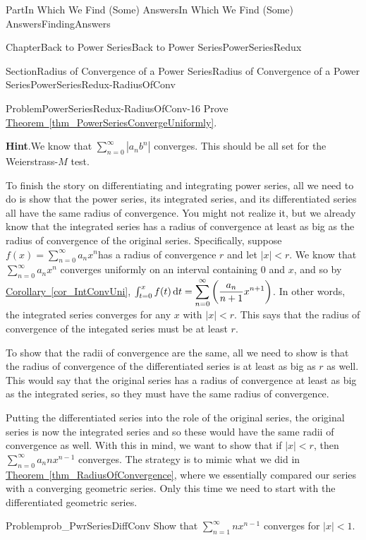 \documentclass[oneside,10pt,]{book}
\newcommand{\blocktitlefont}{\relax}
\newcommand{\xreffont}{\relax}
\numberwithin{equation}{part}
\newcommand{\dx}[1]{\,{\rm d}#1}
\newcommand{\abs}[1]{\left|#1\right|}
\newcommand{\lt}{<}
\begin{document}
\begin{partptx}{Part}{In Which We Find (Some) Answers}{}{In Which We Find (Some) Answers}{}{}{FindingAnswers}
\begin{chapterptx}{Chapter}{Back to Power Series}{}{Back to Power Series}{}{}{PowerSeriesRedux}
\begin{sectionptx}{Section}{Radius of Convergence of a Power Series}{}{Radius of Convergence of a Power Series}{}{}{PowerSeriesRedux-RadiusOfConv}
\begin{problem}{Problem}{}{PowerSeriesRedux-RadiusOfConv-16}
Prove \hyperref[thm_PowerSeriesConvergeUniformly]{Theorem~{\xreffont\ref{thm_PowerSeriesConvergeUniformly}}}.%
\par\smallskip%
\noindent\textbf{\blocktitlefont Hint}.\hypertarget{PowerSeriesRedux-RadiusOfConv-16-3}{}\quad{}We know that \(\displaystyle\sum_{n=0}^\infty|a_nb^n|\) converges. This should be all set for the Weierstrass-\(M\) test.%
\end{problem}
To finish the story on differentiating and integrating power series, all we need to do is show that the power series, its integrated series, and its differentiated series all have the same radius of convergence.  You might not realize it, but we already know that the integrated series has a radius of convergence at least as big as the radius of convergence of the original series.  Specifically, suppose \(f(x)=\displaystyle\sum_{n=0}^\infty a_nx^n\)has a radius of convergence \(r\) and let \(\abs{x}\lt r\).  We know that \(\displaystyle\sum_{n=0}^\infty a_nx^n\) converges uniformly on an interval containing \(0\) and \(x\), and so by \hyperref[cor_IntConvUni]{Corollary~{\xreffont\ref{cor_IntConvUni}}}, \(\int_{t=0}^xf(t)\dx{
t}=\displaystyle\sum_{n=0}^\infty\left(\frac{a_n}{n+1}x^{n+1}\right)\).  In other words, the integrated series converges for any \(x\) with \(\abs{x}\lt r\).  This says that the radius of convergence of the integated series must be at least \(r\).%
\par
To show that the radii of convergence are the same, all we need to show is that the radius of convergence of the differentiated series is at least as big as \(r\) as well. This would say that the original series has a radius of convergence at least as big as the integrated series, so they must have the same radius of convergence.    %
\par
Putting the differentiated series into the role of the original series, the original series is now the integrated series and so these would have the same radii of convergence as well.  With this in mind, we want to show that if \(|x|\lt r\), then \(\displaystyle\sum_{n=0}^\infty a_nnx^{n-1}\) converges. The strategy is to mimic what we did in \hyperref[thm_RadiusOfConvergence]{Theorem~{\xreffont\ref{thm_RadiusOfConvergence}}}, where we essentially compared our series with a converging geometric series.  Only this time we need to start with the differentiated geometric series.%
\begin{problem}{Problem}{}{prob_PwrSeriesDiffConv}%
Show that \(\displaystyle\sum_{n=1}^\infty nx^{n-1}\) converges for \(|x|\lt 1\).%

\end{problem}
\end{sectionptx}
\end{chapterptx}
\end{partptx}
\end{document}
